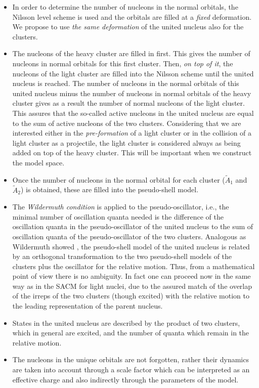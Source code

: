 \documentclass[12pt]{article}
\begin{document}
\begin{itemize}

\item In order to determine the number of nucleons in the normal orbitals,
the Nilsson level scheme is used and the orbitals are filled at 
a {\it fixed} deformation. We propose to use {\it the same deformation} 
of the united nucleus also for the clusters. 

\item The nucleons of the heavy cluster are filled in first.
This gives the number of nucleons
in normal orbitals for this first cluster. Then, {\it on top of it},  
the nucleons of the light cluster 
are filled into
the Nilsson scheme until the united nucleus is reached. 
The number of nucleons in the
normal orbitals of this united nucleus minus the number of nucleons in normal orbitals of
the heavy cluster gives as a result the number of normal nucleons of the light cluster.
This assures that the so-called active nucleons in the united nucleus are equal to the
sum of active nucleons of the two clusters.
Considering that we are interested either in the {\it pre-formation} of a light cluster
or in the collision of a light cluster as a projectile, the light cluster is considered
always as being added on top of the heavy cluster. This will be important when we
construct the model space. 

\item Once the number of nucleons in the normal orbital for each cluster (${\tilde A}_1$ and ${\tilde A}_2$)
is obtained, these are
filled into the pseudo-shell model.

\item The {\it Wildermuth condition} is applied to the  pseu\-do-oscilla\-tor,   i.e., the minimal
number of oscillation quanta needed is the difference of the oscillation quanta in the
pseudo-oscillator  of the united nucleus to the sum of oscillation quanta of the
 pseudo-oscillator  of the two clusters.
Analogous as Wildermuth showed \cite{wildermuth}, the pseudo-shell model of the united nucleus is
related  by an orthogonal transformation
to the two pseudo-shell models of the clusters plus the oscillator for the relative motion.
Thus, from a mathematical point of view there
is no ambiguity. 
In fact one can proceed now in the same way as in the SACM
for light nuclei, due to the assured match of the overlap 
of the irreps of the two clusters (though excited) 
with the relative motion to the leading representation of the parent nucleus.

\item States in the united nucleus are described by the product of two clusters,
which in general are excited,
and the number of quanta which remain in the relative motion.

\item The nucleons in the unique orbitals are not forgotten, rather their dynamics are taken into account through a
scale factor which can be interpreted as an effective charge
and also indirectly through the parameters of the model.

\end{itemize}
\end{document}
